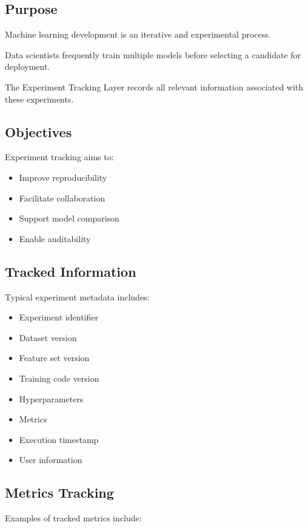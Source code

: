 \subsection{Purpose}

Machine learning development is an iterative and experimental process.

Data scientists frequently train multiple models before selecting a candidate for deployment.

The Experiment Tracking Layer records all relevant information associated with these experiments.

\subsection{Objectives}

Experiment tracking aims to:

\begin{itemize}
    \item Improve reproducibility
    \item Facilitate collaboration
    \item Support model comparison
    \item Enable auditability
\end{itemize}

\subsection{Tracked Information}

Typical experiment metadata includes:

\begin{itemize}
    \item Experiment identifier
    \item Dataset version
    \item Feature set version
    \item Training code version
    \item Hyperparameters
    \item Metrics
    \item Execution timestamp
    \item User information
\end{itemize}

\subsection{Metrics Tracking}

Examples of tracked metrics include:


